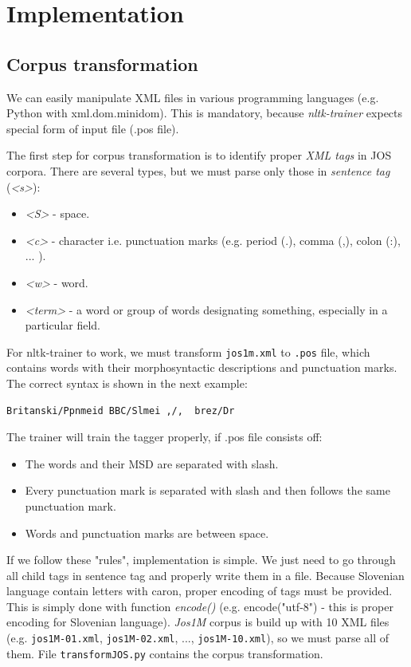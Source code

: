 \documentclass[10pt, conference, compsocconf]{IEEEtran}
\begin{document}
\section{Implementation}
\label{implementation}
\subsection{Corpus transformation} %
\label{Corpus transformation} 

We can easily manipulate XML files in various programming languages (e.g. Python with xml.dom.minidom).
This is mandatory, because \textit{nltk-trainer}\cite{nltk-trainer} expects special form of input file (.pos file).

The first step for corpus transformation is to identify proper \textit{XML tags}\cite{xml_tags} in JOS corpora. There are several types, but we must parse only those in \textit{sentence tag }(\textit{<s>}):
\begin{itemize}
\item \textit{<S>} - space.
\item \textit{<c>} - character i.e. punctuation marks (e.g. period (.), comma (,), colon (:), ... ).
\item \textit{<w>} - word.
\item \textit{<term>} - a word or group of words designating something, especially in a particular field. 
\end{itemize}

For nltk-trainer to work, we must transform \texttt{jos1m.xml} to \texttt{.pos} file, which contains words with their morphosyntactic descriptions and punctuation marks. The correct syntax is shown in the next example:
\begin{lstlisting}
Britanski/Ppnmeid BBC/Slmei ,/,  brez/Dr 
\end{lstlisting}

The trainer will train the tagger properly, if .pos file consists off:
\begin{itemize}
\item The words and their MSD are separated with slash.
\item Every punctuation mark is separated with slash and then follows the same punctuation mark.
\item Words and punctuation marks are between space.
\end{itemize}

If we follow these "rules", implementation is simple. We just need to go through all child tags in sentence tag and properly write them in a file. Because Slovenian language contain letters with caron, proper encoding of tags must be provided. This is simply done with function \textit{encode()} (e.g. encode("utf-8") - this is proper encoding for Slovenian language).
\textit{Jos1M} corpus is build up with 10 XML files (e.g. \texttt{jos1M-01.xml},  \texttt{jos1M-02.xml}, ..., \texttt{jos1M-10.xml}), so we must parse all of them. 
File \texttt{transformJOS.py} contains the corpus transformation.
\end{document}
